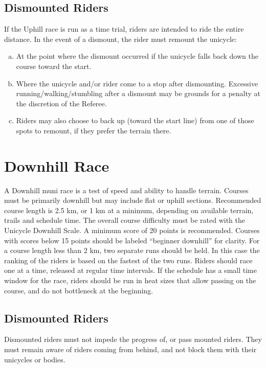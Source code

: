 \subsection{Dismounted Riders}
If the Uphill race is run as a time trial, riders are intended to ride the entire distance.
In the event of a dismount, the rider must remount the unicycle:
\begin{enumerate}[(a)]
\item At the point where the dismount occurred if the unicycle falls back down the course toward the start.
\item Where the unicycle and/or rider come to a stop after dismounting.
Excessive running/walking/stumbling after a dismount may be grounds for a
penalty at the discretion of the Referee.
\item Riders may also choose to back up (toward the start line) from one of those spots to remount, if they prefer the terrain there.
\end{enumerate}

\section{Downhill Race \label{sec:muni_downhill}}
A Downhill muni race is a test of speed and ability to handle terrain.
Courses must be primarily downhill but may include flat or uphill sections.
Recommended course length is 2.5 km, or 1 km at a minimum, depending on available terrain, trails and schedule time.
The overall course difficulty must be rated with the Unicycle Downhill Scale.
A minimum score of 20 points is recommended.
Courses with scores below 15 points should be labeled ``beginner downhill'' for clarity.
For a course length less than 2 km, two separate runs should be held.
In this case the ranking of the riders is based on the fastest of the two runs.
Riders should race one at a time, released at regular time intervals.
If the schedule has a small time window for the race, riders should be run in heat sizes that allow passing on the course, and do not bottleneck at the beginning.

\subsection{Dismounted Riders}
Dismounted riders must not impede the progress of, or pass mounted riders.
They must remain aware of riders coming from behind, and not block them with their
unicycles or bodies.

